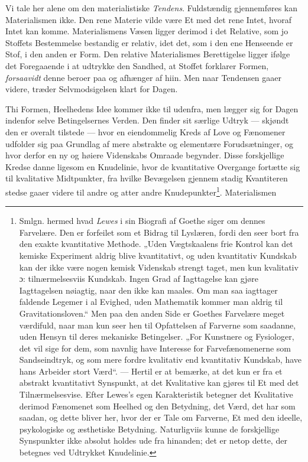 \documentclass[12pt,a4paper,openany]{book}
\newcommand{\opage}[1]{\marginnote{\footnotesize\textit{[#1]}}}
\begin{document}
Vi tale her alene om den materialistiske \emph{Tendens}.
Fuldstændig gjennemføres kan Materialismen ikke. Den rene
Materie vilde være Et med det rene Intet, hvoraf Intet kan
komme. Materialismens Væsen ligger derimod i det Relative,
som jo Stoffets Bestemmelse bestandig er relativ, idet
det, som i den ene Henseende er Stof, i den anden er Form.
\opage{197}Den relative Materialismes Berettigelse ligger ifølge det
Foregaaende i at udtrykke den Sandhed, at Stoffet forklarer
Formen, \emph{forsaavidt} denne beroer paa og afhænger af hiin.
Men naar Tendensen gaaer videre, træder Selvmodsigelsen
klart for Dagen.

Thi Formen, Heelhedens Idee kommer ikke til udenfra,
men lægger sig for Dagen indenfor selve Betingelsernes
Verden. Den finder sit særlige Udtryk --- skjøndt den er
overalt tilstede --- hvor en eiendommelig Kreds af Love og
Fænomener udfolder sig paa Grundlag af mere abstrakte og
elementære Forudsætninger, og hvor derfor en ny og høiere
Videnskabs Omraade begynder. Disse forskjellige Kredse
danne ligesom en Knudelinie, hvor de kvantitative Overgange
fortætte sig til kvalitative Midtpunkter, fra hvilke Bevægelsen
gjennem stadig Kvantiteren stedse gaaer videre til
andre og atter andre Knudepunkter\footnote{Smlgn. hermed hvad \emph{Lewes} i sin Biografi af Goethe siger om dennes Farvelære. Den er forfeilet som et Bidrag til Lyslæren, fordi den seer bort fra den exakte kvantitative Methode. „Uden Vægtskaalens frie Kontrol kan det kemiske Experiment aldrig blive kvantitativt, og uden kvantitativ Kundskab kan der ikke være nogen kemisk Videnskab strengt taget, men kun kvalitativ ɔ: tilnærmelsesviis Kundskab. Ingen Grad af Iagttagelse kan gjøre Iagttagelsen nøiagtig, naar den ikke kan maales. Om man saa iagttager faldende Legemer i al Evighed, uden Mathematik kommer man aldrig til Gravitationsloven.“ Men paa den anden Side er Goethes Farvelære meget værdifuld, naar man kun seer hen til Opfattelsen af Farverne som saadanne, uden Hensyn til deres mekaniske Betingelser. „For Kunstnere og Fysiologer, det vil sige for dem, som navnlig have Interesse for Farvefænomenerne som Sandseindtryk, og som mere fordre kvalitativ end kvantitativ Kundskab, have hans Arbeider stort Værd“. --- Hertil er at bemærke, at det kun er fra et abstrakt kvantitativt Synspunkt, at det Kvalitative kan gjøres til Et med det Tilnærmelsesvise. Efter Lewes's egen Karakteristik betegner det Kvalitative derimod Fænomenet som Heelhed og den Betydning, det Værd, det har som saadan, og dette bliver her, hvor der er Tale om Farverne, Et med den ideelle, psykologiske og æsthetiske Betydning. Naturligviis kunne de forskjellige Synspunkter ikke absolut holdes ude fra hinanden; det er netop dette, der betegnes ved Udtrykket Knudelinie.}. Materialismen
\end{document}
